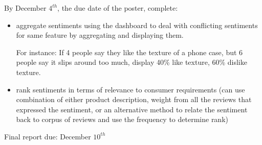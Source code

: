 \documentclass{article}
\begin{document}
By December $4^{th}$, the due date of the poster, complete:
\begin{itemize}
\item aggregate sentiments using the dashboard to deal with conflicting sentiments for same feature by aggregating and displaying them. 

For instance: If 4 people say they like the texture of a phone case, but 6 people say it slips around too much, display 40\% like texture, 60\% dislike texture. 

\item 
rank sentiments in terms of relevance to consumer requirements (can use combination of either product description, weight from all the reviews that expressed the sentiment, or an alternative method to relate the sentiment back to corpus of reviews and use the frequency to determine rank)

\end{itemize}

Final report due: December $10^{th}$
\end{document}
